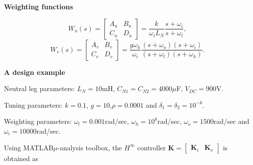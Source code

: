 \documentclass[landscape,a0,final]{a0poster}
\newcommand{\mysubsection}[1]{
  \vspace{1cm}
  {\bf\textcolor{TextCol}{#1}}
  \par\vspace{0.75cm}
}
\begin{document}
\begin{multicols}{6}
{\mysubsection{Weighting functions}
\[
W_{u}(s)=\left[ \begin{array}{rc}
A_u & B_u\\
\hline C_u & D_u
\end{array}\right] =\frac{k}{\omega _{i}L_{N}}\frac{s+\omega _{i}}{s+\omega _{l}},\]
\[
W_{v}(s)=\left[ \begin{array}{rc}
A_v & B_v\\
\hline C_v & D_v
\end{array}\right]=\frac{g\omega _{h}}{\omega _{i}}\frac{(s+\omega _{o})(s+\omega _{i})}{(s+\omega _{l})(s+\omega _{h})}.\]
}%


\mysubsection{A design example}

Neutral leg parameters: \( L_{N}=10 \)mH, \( C_{N1}=C_{N2}=4000\mu  \)F, \( V_{DC}=900 \)V. 

Tuning parameters: \( k=0.1 \), \( g=10 \),\hfill \( \rho =0.0001 \)
and \( \delta _{1}=\delta _{2}=10^{-6} \). 

Weighting parameters: \( \omega _{l}=0.001 \)rad/sec, \( \omega _{h}=10^{8} \)rad/sec, \hfill
\( \omega _{o}=1500 \)rad/sec \hfill and \( \omega _{i}=10000 \)rad/sec. 

Using MATLAB\texttrademark \( \mu  \)-analysis toolbox, the \( H^{\infty } \)
controller \( \mathbf{K}=\left[ \begin{array}{cc}
\mathbf{K}_{i} & \mathbf{K}_{v}
\end{array}\right]  \) is obtained as



\end{multicols}
\end{document}
